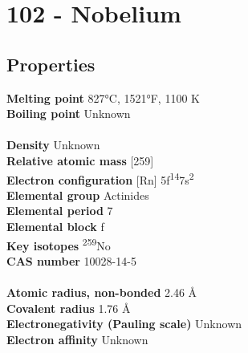 \section{102 - Nobelium}
\label{sec:elem-nobelium}
\subsection{Properties}
\textbf{Melting point} 827°C, 1521°F, 1100 K\\
\textbf{Boiling point} Unknown\\
\\
\textbf{Density} Unknown\\
\textbf{Relative atomic mass} [259]\\
\textbf{Electron configuration} [Rn] 5f\textsuperscript{14}7s\textsuperscript{2}\\
\textbf{Elemental group} Actinides\\
\textbf{Elemental period} 7\\
\textbf{Elemental block} f\\
\textbf{Key isotopes} \textsuperscript{259}No\\
\textbf{CAS number} 10028-14-5\\
\\
\textbf{Atomic radius, non-bonded} 2.46 Å\\
\textbf{Covalent radius} 1.76 Å\\
\textbf{Electronegativity (Pauling scale)} Unknown\\
\textbf{Electron affinity} Unknown\\
